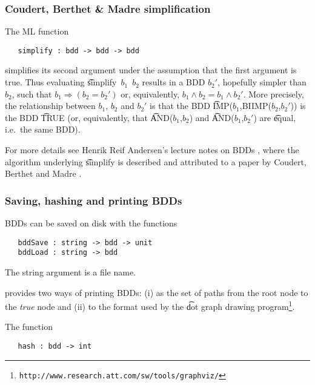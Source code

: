\subsubsection{Coudert, Berthet \& Madre simplification}

The ML function

\begin{verbatim}
   simplify : bdd -> bdd -> bdd
\end{verbatim}

simplifies its second argument under the assumption that the first
argument is true. Thus evaluating
\t{simplify~$b_1$~$b_2$} results in a BDD $b_2'$, hopefully simpler than $b_2$, such that
$b_1 \Rightarrow (b_2 = b_2')$ or, equivalently, \mbox{$b_1 \wedge b_2 = b_1 \wedge b_2'$}.
More precisely,
the relationship between $b_1$, $b_2$ and $b_2'$ is that
the BDD \t{IMP($b_1$,BIIMP($b_2$,$b_2'$))} is the BDD \t{TRUE}
(or, equivalently, that \t{AND($b_1$,$b_2$)} and \t{AND($b_1$,$b_2'$)}
are \t{equal}, i.e.~the same BDD).

For more details see Henrik Reif Andersen's lecture
notes on BDDs \cite{HenrikNotes}, where
the algorithm underlying \t{simplify} is described and attributed to a paper by
Coudert, Berthet and Madre \cite{CoudertBerthetMadre}.

\subsubsection{Saving, hashing and printing BDDs}\label{printing}

BDDs can be saved on disk with the functions

\begin{verbatim}
   bddSave : string -> bdd -> unit
   bddLoad : string -> bdd
\end{verbatim}

The string argument is a file name.

\Buddy{} provides two ways of printing BDDs: (i) as the set of paths from
the root node to the {\it{true}} node and (ii) to the format used by
the \t{dot} graph drawing
program\footnote{\texttt{http://www.research.att.com/sw/tools/graphviz/}}.

The function

\begin{verbatim}
   hash : bdd -> int
\end{verbatim}

